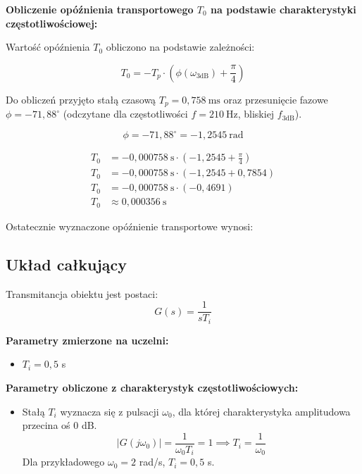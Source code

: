 \documentclass[12pt,a4paper]{article}
\begin{document}
	\noindent \textbf{Obliczenie opóźnienia transportowego $T_0$ na podstawie charakterystyki częstotliwościowej:}
	
	Wartość opóźnienia $T_0$ obliczono na podstawie zależności:
	
	\begin{equation}
		T_0 = -T_p \cdot \left( \phi(\omega_{3\text{dB}}) + \frac{\pi}{4} \right)
	\end{equation}
	
	Do obliczeń przyjęto stałą czasową $T_p = 0{,}758~\text{ms}$ oraz przesunięcie fazowe 
	$\phi = -71{,}88^{\circ}$ (odczytane dla częstotliwości $f = 210~\text{Hz}$, bliskiej $f_{3\text{dB}}$).
	
	
	\[
	\phi = -71{,}88^{\circ} = -1{,}2545~\text{rad}
	\]
	
	
	\begin{align*}
		T_0 &= -0{,}000758~\text{s} \cdot \left( -1{,}2545 + \frac{\pi}{4} \right) \\
		T_0 &= -0{,}000758~\text{s} \cdot \left( -1{,}2545 + 0{,}7854 \right) \\
		T_0 &= -0{,}000758~\text{s} \cdot (-0{,}4691) \\
		T_0 &\approx 0{,}000356~\text{s}
	\end{align*}
	
	\noindent Ostatecznie wyznaczone opóźnienie transportowe wynosi:
	
	\subsection{Układ całkujący}
	Transmitancja obiektu jest postaci:
	\begin{equation}
		G(s) = \frac{1}{sT_i}
	\end{equation}
	
	\noindent \textbf{Parametry zmierzone na uczelni:}
	\begin{itemize}
		\item $T_i = 0{,}5$ s %
	\end{itemize}
	
	\noindent \textbf{Parametry obliczone z charakterystyk częstotliwościowych:}
	\begin{itemize}
		\item Stałą $T_i$ wyznacza się z pulsacji $\omega_0$, dla której charakterystyka amplitudowa przecina oś 0 dB.
		$$|G(j\omega_0)| = \frac{1}{\omega_0 T_i} = 1 \implies T_i = \frac{1}{\omega_0}$$
		Dla przykładowego $\omega_0 = 2$ rad/s, $T_i=0,5$ s.
	\end{itemize}
	
\end{document}
